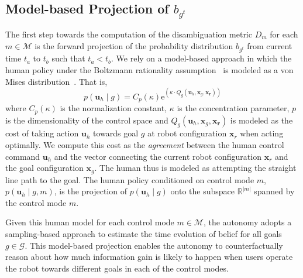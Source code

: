\documentclass[letterpaper, 10 pt, conference]{ieeeconf}  %
\begin{document}
\subsection{Model-based Projection of $b_{g^t}$}\label{ssec:model_based}
The first step towards the computation of the disambiguation metric $D_m$ for each $m \in \mathcal{M}$ is the forward projection of the probability distribution $b_{g^t}$ from current time $t_a$ to $t_b$ such that $t_a < t_b$. We rely on a model-based approach in which the human policy under the Boltzmann rationality assumption~\cite{hula2015monte} is modeled as a von Mises distribution~\cite{mardia1975statistics}. That is,
\begin{equation}
	p(\boldsymbol{u}_h \;| \;g ) = C_p(\kappa)\text{e}^{(\kappa\cdot Q_g(\boldsymbol{u}_h, \boldsymbol{x}_g, \boldsymbol{x_r}))}
\end{equation}
where $C_p(\kappa)$ is the normalization constant, $\kappa$ is the concentration parameter, $p$ is the dimensionality of the control space and $Q_g(\boldsymbol{u}_h, \boldsymbol{x}_g, \boldsymbol{x_r})$ is modeled as the cost of taking action $\boldsymbol{u}_h$ towards goal $g$ at robot configuration $\boldsymbol{x}_r$ when acting optimally. We compute this cost as the \textit{agreement} between the human control command $\boldsymbol{u}_h$ and the vector connecting the current robot configuration $\boldsymbol{x}_r$ and the goal configuration $\boldsymbol{x}_g$. The human thus is modeled as attempting the straight line path to the goal. The human policy conditioned on control mode $m$, $p(\boldsymbol{u}_h \;| \;g, m )$, is the projection of $p(\boldsymbol{u}_h \;| \;g )$ onto the subspace $\mathbb{R}^{|m|}$ spanned by the control mode $m$. 

Given this human model for each control mode $m \in \mathcal{M}$, the autonomy adopts a sampling-based approach to estimate the time evolution of belief for all goals $g \in \mathcal{G}$. This model-based projection enables the autonomy to counterfactually reason about how much information gain is likely to happen when users operate the robot towards different goals in each of the control modes. 
\end{document}
